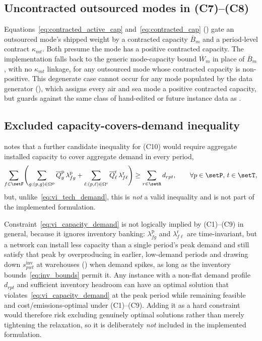 \subsection{Uncontracted outsourced modes in (C7)--(C8)}
\label{app:impl_notes:uncontracted}

Equations~\eqref{eq:contracted_active_cap} and~\eqref{eq:contracted_cap}
() gate an outsourced mode's shipped
weight by a contracted capacity $\overline{B}_m$ and a period-level
contract $\kappa_{mt}$. Both presume the mode has a positive contracted
capacity. The implementation falls back to the generic mode-capacity
bound $\overline{W}_m$ in place of $\overline{B}_m$, with no
$\kappa_{mt}$ linkage, for any outsourced mode whose contracted
capacity is non-positive. This degenerate case cannot occur for any
mode populated by the data generator
(), which assigns every air and sea
mode a positive contracted capacity, but guards against the same class
of hand-edited or future instance data as
.

\subsection{Excluded capacity-covers-demand inequality}
\label{app:impl_notes:capdemand}

 notes that a further candidate inequality for
(C10) would require aggregate installed capacity to cover aggregate
demand in every period,
\begin{equation}
\sum_{f\in\setF}\Biggl(
   \sum_{g:(p,g)\in\Omega^{\mathrm{p}}}
      \overline{Q}^{\mathrm{p}}_g\,\lambda^{\mathrm{p}}_{fg}
 + \sum_{\ell:(p,\ell)\in\Omega^{\mathrm{r}}}
      \overline{Q}^{\mathrm{r}}_{\ell}\,\lambda^{\mathrm{r}}_{f\ell}
\Biggr)
\ge \sum_{r\in\setR} d_{rpt},
\qquad \forall p\in\setP,\,t\in\setT,
\label{eq:vi_capacity_demand}
\end{equation}
but, unlike~\eqref{eq:vi_tech_demand}, this is \emph{not} a valid
inequality and is not part of the implemented formulation.

Constraint~\eqref{eq:vi_capacity_demand} is not logically implied by
(C1)--(C9) in general, because it ignores inventory banking:
$\lambda^{\mathrm{p}}_{fg}$ and $\lambda^{\mathrm{r}}_{f\ell}$ are
time-invariant, but a network can install less capacity than a single
period's peak demand and still satisfy that peak by overproducing in
earlier, low-demand periods and drawing down $s^{\mathrm{inv}}_{pwt}$
at warehouses () when demand spikes, as long as
the inventory bounds~\eqref{eq:inv_bounds} permit it. Any instance
with a non-flat demand profile $d_{rpt}$ and sufficient inventory
headroom can have an optimal solution that
violates~\eqref{eq:vi_capacity_demand} at the peak period while
remaining feasible and cost/emissions-optimal under (C1)--(C9). Adding
it as a hard constraint would therefore risk excluding genuinely
optimal solutions rather than merely tightening the relaxation, so it
is deliberately \emph{not} included in the implemented formulation.

